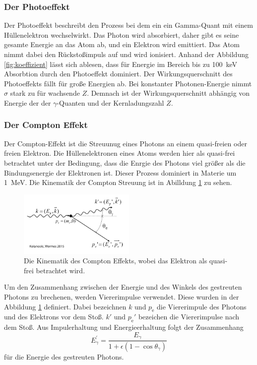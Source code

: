 \subsubsection{Der Photoeffekt}
\label{sec:photoeffekt}

Der Photoeffekt beschreibt den Prozess bei dem ein ein Gamma-Quant mit einem Hüllenelektron wechselwirkt.
Das Photon wird absorbiert, daher gibt es seine gesamte Energie an das Atom ab, und ein Elektron wird emittiert. 
Das Atom nimmt dabei den Rückstoßimpuls auf und wird ionisiert.
Anhand der Abbildung \ref{fig:koeffizient} lässt sich ablesen, dass für Energie im Bereich bis zu \qty{100}{\kilo\eV} 
Absorbtion durch den Photoeffekt dominiert. Der Wirkungsquerschnitt des Photoeffekts fällt für große Energien ab.
Bei konstanter Photonen-Energie nimmt $\sigma$ stark zu für wachsende $Z$.
Demnach ist der Wirkungsquerschnitt abhängig von Energie der der $\gamma$-Quanten und der Kernladungszahl $Z$.

\subsubsection{Der Compton Effekt}
\label{sec:compton}

Der Compton-Effekt ist die Streuunug eines Photons an einem quasi-freien oder freien Elektron.
Die Hüllenelektronen eines Atoms werden hier als quasi-frei betrachtet unter der Bedingung, dass
die Enrgie des Photons viel größer als die Bindungsenergie der Elektronen ist. Dieser Prozess
dominiert in Materie um \qty{1}{\mega\eV}.
Die Kinematik der Compton Streuung ist in Abilldung \ref{fig:compton} zu sehen.

\begin{figure}[H]
    \centering
    \includegraphics[width=0.5\textwidth]{content/grafik/compton.jpg}
    \caption{Die Kinematik des Compton Effekts, wobei das Elektron als quasi-frei betrachtet wird.\cite{teilchendetektoren}}
    \label{fig:compton}
\end{figure}

Um den Zusammenhang zwischen der Energie und des Winkels des gestreuten Photons
zu brechenen, werden Viererimpulse verwendet. Diese wurden in der Abbildung \ref{fig:compton} definiert.
Dabei bezeichnen $k$ und $p_{\text{e}}$ die Viererimpule des Photons und des Elektrons vor dem Stoß.
$k'$ und $p_{\text{e}}'$ bezeichen die Viererimpulse nach dem Stoß.
Aus Impulerhaltung und Energieerhaltung folgt der Zusammenhang
\begin{equation}
    E_\gamma^{\prime}=\frac{E_\gamma}{1+\epsilon\left(1-\cos \theta_\gamma\right)}
    \label{eqn:Energie_comptonstreuung}
\end{equation}
für die Energie des gestreuten Photons.

